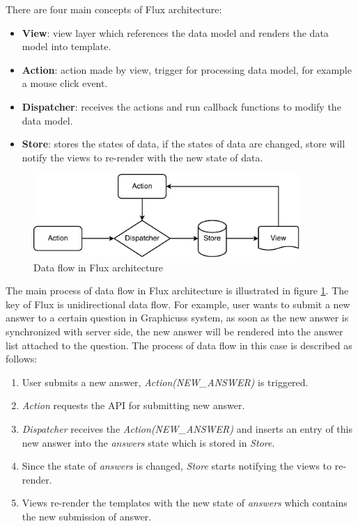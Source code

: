 There are four main concepts of Flux architecture: 
\begin{itemize}
  \item 
  \textbf{View}: view layer which references the data model and renders the data model into template.
  \item 
  \textbf{Action}: action made by view, trigger for processing data model, for example a mouse click event.
  \item 
  \textbf{Dispatcher}: receives the actions and run callback functions to modify the data model.
  \item 
  \textbf{Store}: stores the states of data, if the states of data are changed, store will notify the views to re-render with the new state of data.
\end{itemize}

\begin{figure}[!htbp]
  \centering
    \includegraphics[width=0.9\textwidth]{Figures/imp-flux-arch.pdf}
  \caption{Data flow in Flux architecture}
  \label{fig:flux-arch-imp}
\end{figure}

The main process of data flow in Flux architecture is illustrated in figure \ref{fig:flux-arch-imp}. The key of Flux is unidirectional data flow. For example, user wants to submit a new answer to a certain question in Graphicuss system, as soon as the new answer is synchronized with server side, the new answer will be rendered into the answer list attached to the question. The process of data flow in this case is described as follows:
\begin{enumerate}
  \item 
  User submits a new answer, \textit{Action(NEW\_ANSWER)} is triggered.
  \item 
  \textit{Action} requests the API for submitting new answer.
  \item 
  \textit{Dispatcher} receives the \textit{Action(NEW\_ANSWER)} and inserts an entry of this new answer into the \textit{answers} state which is stored in \textit{Store}.
  \item 
  Since the state of \textit{answers} is changed, \textit{Store} starts notifying the views to re-render.
  \item 
  Views re-render the templates with the new state of \textit{answers} which contains the new submission of answer.
\end{enumerate}